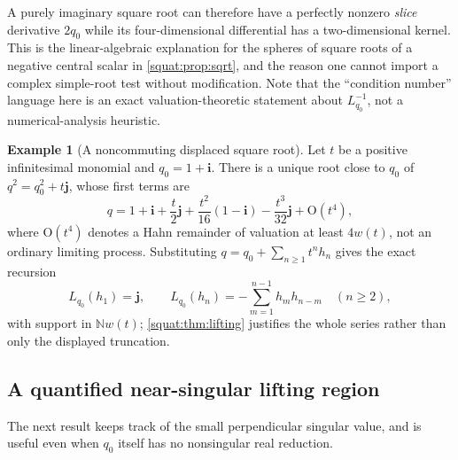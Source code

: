 \documentclass[11pt,letterpaper]{article}
\numberwithin{equation}{section}
\theoremstyle{definition}
\newtheorem{example}[example]{Example}
\theoremstyle{remark}
\newcommand{\N}{\mathbb N}
\newcommand{\ii}{\mathbf i}
\newcommand{\jj}{\mathbf j}
\begin{document}
A purely imaginary square root can therefore have a perfectly nonzero \emph{slice}
derivative $2q_0$ while its four-dimensional differential has a two-dimensional kernel.
This is the linear-algebraic explanation for the spheres of square roots of a negative
central scalar in \cref{squat:prop:sqrt}, and the reason one cannot import a complex
simple-root test without modification. Note that the ``condition number'' language here is
an exact valuation-theoretic statement about $L_{q_0}^{-1}$, not a numerical-analysis
heuristic.

\begin{example}[A noncommuting displaced square root]\label{squat:ex:displacedsqrt}
Let $t$ be a positive infinitesimal monomial and $q_0=1+\ii$. There is a unique root close
to $q_0$ of $q^2=q_0^2+t\jj$, whose first terms are
\begin{equation}\label{squat:eq:sqrt-example}
 q=1+\ii+\frac{t}{2}\jj+\frac{t^2}{16}(1-\ii)-\frac{t^3}{32}\jj+\mathrm O(t^4),
\end{equation}
where $\mathrm O(t^4)$ denotes a Hahn remainder of valuation at least $4w(t)$, not an
ordinary limiting process. Substituting $q=q_0+\sum_{n\ge1}t^nh_n$ gives the exact
recursion
\[
 L_{q_0}(h_1)=\jj,\qquad
 L_{q_0}(h_n)=-\sum_{m=1}^{n-1}h_mh_{n-m}\quad(n\ge2),
\]
with support in $\N w(t)$; \cref{squat:thm:lifting} justifies the whole series rather than
only the displayed truncation.
\end{example}

\subsection{A quantified near-singular lifting region}\label{squat:sub:conditioned}
The next result keeps track of the small perpendicular singular value, and is useful even
when $q_0$ itself has no nonsingular real reduction.
\end{document}
